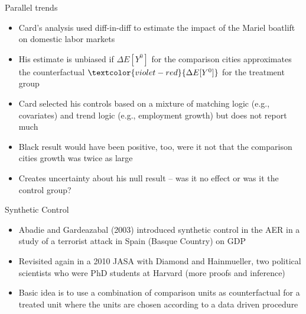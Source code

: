 \documentclass{beamer}
\begin{document}
\begin{frame}{Parallel trends}

\begin{itemize}
\item Card's analysis used diff-in-diff to estimate the impact of the Mariel boatlift on domestic labor markets
\item His estimate is unbiased if $\Delta E[Y^0]$ for the comparison cities approximates the counterfactual $\textcolor{violet-red}{\Delta E[Y^0]}$ for the treatment group
\item Card selected his controls based on a mixture of matching logic (e.g., covariates) and trend logic (e.g., employment growth) but does not report much
\item Black result would have been positive, too, were it not that the comparison cities growth was twice as large
\item Creates uncertainty about his null result -- was it no effect or was it the control group?
\end{itemize}

\end{frame}


\begin{frame}{Synthetic Control}
	
	\begin{itemize}
	\item Abadie and Gardeazabal (2003) introduced synthetic control in the AER in a study of a terrorist attack in Spain (Basque Country) on GDP
	\item Revisited again in a 2010 JASA with Diamond and Hainmueller, two political scientists who were PhD students at Harvard (more proofs and inference)
	\item Basic idea is to use a combination of comparison units as counterfactual for a treated unit where the units are chosen according to a data driven procedure
	\end{itemize}
\end{frame}
\end{document}
